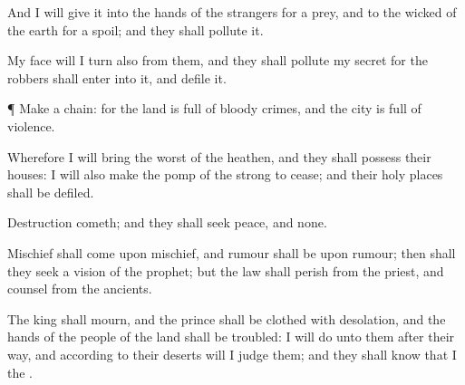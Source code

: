 {And I will
give it into the
hands of the
strangers for a
prey, and to the
wicked of the
earth for a
spoil; and they shall
pollute it.

My
face will I
turn also from them, and they shall
pollute my
secret
{} for the
robbers shall
enter into it, and
defile it.


\par }{\PP {}¶
Make a
chain: for the
land is
full of
bloody
crimes, and the
city is
full of
violence.

Wherefore I will
bring the
worst of the
heathen, and they shall
possess their
houses: I will also make the
pomp of the
strong to
cease; and their holy
places shall be
defiled.

Destruction
cometh; and they shall
seek
peace, and
{} none.

Mischief shall
come upon
mischief, and
rumour shall be upon
rumour; then shall they
seek a
vision of the
prophet; but the
law shall
perish from the
priest, and
counsel from the
ancients.

The
king shall
mourn, and the
prince shall be
clothed with
desolation, and the
hands of the
people of the
land shall be
troubled: I will
do unto them after their
way, and according to their
deserts will I
judge them; and they shall
know that I
{} the
{}.




\par }
